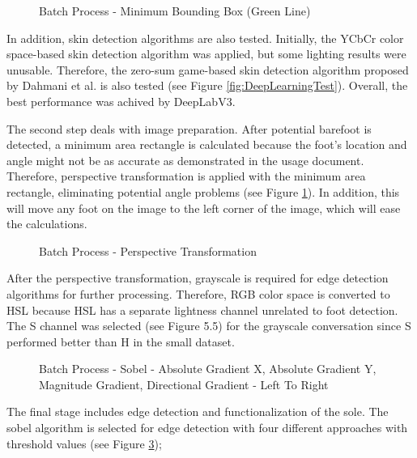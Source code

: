 \begin{figure}[htbp]
\centering
{}
\caption{Batch Process - Minimum Bounding Box (Green Line)}
\label{fig:BatchProcessMinimumBoundingBox}
\end{figure}

In addition, skin detection algorithms are also tested. Initially, the YCbCr color space-based skin detection algorithm was applied, but some lighting results were unusable. Therefore, the zero-sum game-based skin detection algorithm proposed by Dahmani et al. \cite{dahmani2020zero} is also tested (see Figure \ref{fig:DeepLearningTest}). Overall, the best performance was achived by DeepLabV3. 

The second step deals with image preparation. After  potential barefoot is detected, a minimum area rectangle is calculated because the foot's location and angle might not be as accurate as demonstrated in the usage document. Therefore, perspective transformation is applied with the minimum area rectangle, eliminating potential angle problems (see Figure \ref{fig:BatchProcessMinimumBoundingBox}). In addition, this will move any foot on the image to the left corner of the image, which will ease the calculations.

\begin{figure}[htbp]
\centering
{}
\caption{Batch Process - Perspective Transformation}
\label{fig:BatchProcessPerspectiveTransformation}
\end{figure}

After the perspective transformation, grayscale is required for edge detection algorithms for further processing. Therefore, RGB color space is converted to HSL because HSL has a separate lightness channel unrelated to foot detection. The S channel was selected (see Figure 5.5) for the grayscale conversation since S performed better than H in the small dataset.


\begin{figure}[htbp]
\centering
{}
\caption{Batch Process - Sobel - Absolute Gradient X, Absolute Gradient Y, Magnitude Gradient, Directional Gradient - Left To Right}
\label{fig:BatchProcessSobelOutput}
\end{figure}

The final stage includes edge detection and functionalization of the sole. The sobel algorithm is selected for edge detection with four different approaches with threshold values (see Figure \ref{fig:BatchProcessSobelOutput});

